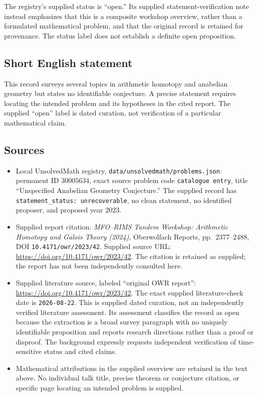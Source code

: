 \documentclass[11pt]{article}
\begin{document}
The registry's supplied status is ``open.'' Its supplied statement-verification note instead emphasizes that this is a composite workshop overview, rather than a formulated mathematical problem, and that the original record is retained for provenance. The status label does not establish a definite open proposition.
\subsection{Short English statement}
This record surveys several topics in arithmetic homotopy and anabelian geometry but states no identifiable conjecture. A precise statement requires locating the intended problem and its hypotheses in the cited report. The supplied ``open'' label is dated curation, not verification of a particular mathematical claim.
\subsection{Sources}
\begin{itemize}
\item Local UnsolvedMath registry, \texttt{data/unsolvedmath/problems.json}: permanent ID \(30005634\), exact source problem code \texttt{catalogue entry}, title ``Unspecified Anabelian Geometry Conjecture.'' The supplied record has \texttt{statement\_status: unrecoverable}, no clean statement, no identified proposer, and proposed year \(2023\).
\item Supplied report citation: \emph{MFO--RIMS Tandem Workshop: Arithmetic Homotopy and Galois Theory (2024)}, Oberwolfach Reports, pp.\ 2377--2488, DOI \texttt{10.4171/owr/2023/42}. Supplied source URL: \url{https://doi.org/10.4171/owr/2023/42}. The citation is retained as supplied; the report has not been independently consulted here.
\item Supplied literature source, labeled ``original OWR report'': \url{https://doi.org/10.4171/owr/2023/42}. The exact supplied literature-check date is \texttt{2026-08-22}. This is supplied dated curation, not an independently verified literature assessment. Its assessment classifies the record as open because the extraction is a broad survey paragraph with no uniquely identifiable proposition and reports research directions rather than a proof or disproof. The background expressly requests independent verification of time-sensitive status and cited claims.
\item Mathematical attributions in the supplied overview are retained in the text above. No individual talk title, precise theorem or conjecture citation, or specific page locating an intended problem is supplied.
\end{itemize}
\end{document}
